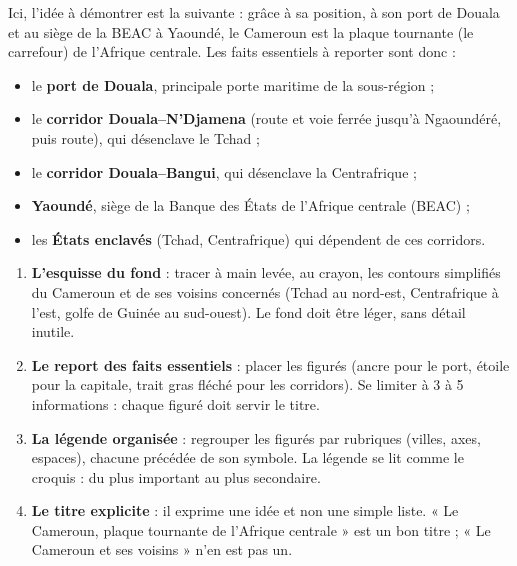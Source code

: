 \documentclass[11pt]{article}
\newcommand{\cle}[1]{{\popxbold\color{popdark}#1}}
\begin{document}
Ici, l'idée à démontrer est la suivante : grâce à sa position, à son port de Douala et au siège de la BEAC à Yaoundé, le Cameroun est la \cle{plaque tournante} (le carrefour) de l'Afrique centrale. Les faits essentiels à reporter sont donc :

\begin{itemize}
\item le \textbf{port de Douala}, principale porte maritime de la sous-région ;
\item le \textbf{corridor Douala--N'Djamena} (route et voie ferrée jusqu'à Ngaoundéré, puis route), qui désenclave le Tchad ;
\item le \textbf{corridor Douala--Bangui}, qui désenclave la Centrafrique ;
\item \textbf{Yaoundé}, siège de la Banque des États de l'Afrique centrale (BEAC) ;
\item les \textbf{États enclavés} (Tchad, Centrafrique) qui dépendent de ces corridors.
\end{itemize}

\begin{methode}
\begin{enumerate}
\item \textbf{L'esquisse du fond} : tracer à main levée, au crayon, les contours simplifiés du Cameroun et de ses voisins concernés (Tchad au nord-est, Centrafrique à l'est, golfe de Guinée au sud-ouest). Le fond doit être léger, sans détail inutile.
\item \textbf{Le report des faits essentiels} : placer les figurés (ancre pour le port, étoile pour la capitale, trait gras fléché pour les corridors). Se limiter à 3 à 5 informations : chaque figuré doit servir le titre.
\item \textbf{La légende organisée} : regrouper les figurés par rubriques (villes, axes, espaces), chacune précédée de son symbole. La légende se lit comme le croquis : du plus important au plus secondaire.
\item \textbf{Le titre explicite} : il exprime une idée et non une simple liste. « Le Cameroun, plaque tournante de l'Afrique centrale » est un bon titre ; « Le Cameroun et ses voisins » n'en est pas un.
\end{enumerate}
\end{methode}
\end{document}
